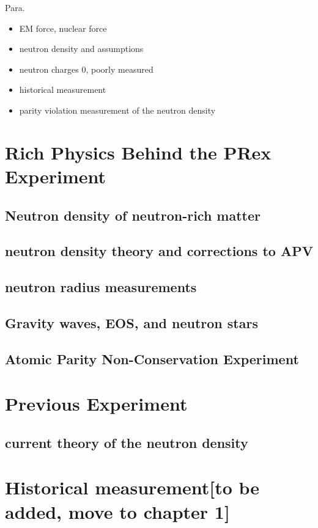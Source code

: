 Para. 

\begin{itemize}
    \item EM force, nuclear force
    \item neutron density and assumptions
\end{itemize}


\begin{itemize}
    \item neutron charges 0, poorly measured
    \item historical measurement 
    \item parity violation measurement of the neutron density
\end{itemize} 

\section{Rich Physics Behind the PRex Experiment}
\subsection{Neutron density of neutron-rich matter}
\subsection{neutron density theory and corrections to APV}
\subsection{neutron radius measurements}
\subsection{Gravity waves, EOS, and neutron stars}
\subsection{Atomic Parity Non-Conservation Experiment}

\section{Previous Experiment}
\subsection{current theory of the neutron density}

\section{Historical measurement[to be added, move to chapter 1]}
